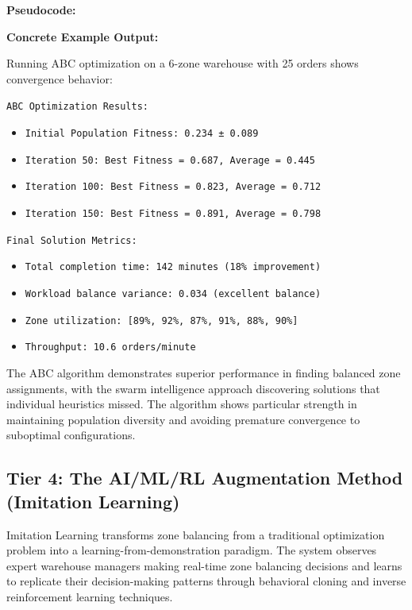 \documentclass{article}
\begin{document}
\textbf{Pseudocode:}



\textbf{Concrete Example Output:}

Running ABC optimization on a 6-zone warehouse with 25 orders shows convergence behavior:

\texttt{ABC Optimization Results:}
\begin{itemize}
\item \texttt{Initial Population Fitness: 0.234 ± 0.089}
\item \texttt{Iteration 50: Best Fitness = 0.687, Average = 0.445}
\item \texttt{Iteration 100: Best Fitness = 0.823, Average = 0.712}  
\item \texttt{Iteration 150: Best Fitness = 0.891, Average = 0.798}
\end{itemize}

\texttt{Final Solution Metrics:}
\begin{itemize}
\item \texttt{Total completion time: 142 minutes (18\% improvement)}
\item \texttt{Workload balance variance: 0.034 (excellent balance)}
\item \texttt{Zone utilization: [89\%, 92\%, 87\%, 91\%, 88\%, 90\%]}
\item \texttt{Throughput: 10.6 orders/minute}
\end{itemize}

The ABC algorithm demonstrates superior performance in finding balanced zone assignments, with the swarm intelligence approach discovering solutions that individual heuristics missed. The algorithm shows particular strength in maintaining population diversity and avoiding premature convergence to suboptimal configurations.

\subsection{Tier 4: The AI/ML/RL Augmentation Method (Imitation Learning)}

Imitation Learning transforms zone balancing from a traditional optimization problem into a learning-from-demonstration paradigm. The system observes expert warehouse managers making real-time zone balancing decisions and learns to replicate their decision-making patterns through behavioral cloning and inverse reinforcement learning techniques.
\end{document}
